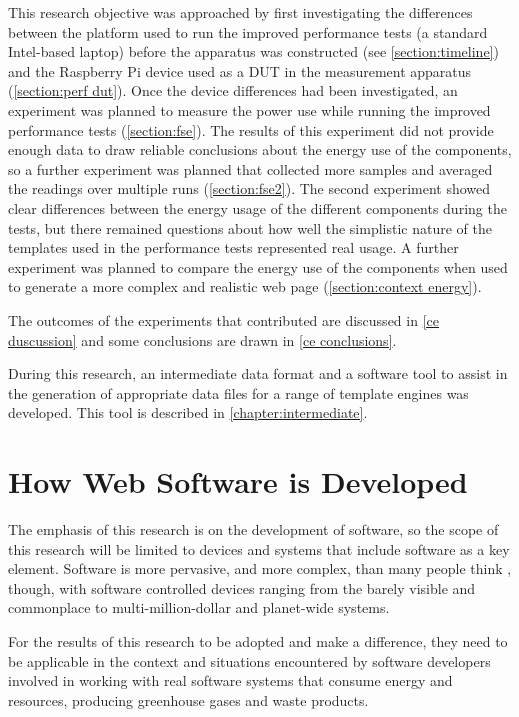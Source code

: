 \label{A207}
This research objective was approached by first investigating the differences between the platform used to run the improved performance tests (a standard Intel-based laptop) before the apparatus was constructed (see \autoref{section:timeline}) and the Raspberry Pi device used as a DUT in the measurement apparatus (\autoref{section:perf dut}). Once the device differences had been investigated, an experiment was planned to measure the power use while running the improved performance tests (\autoref{section:fse}). The results of this experiment did not provide enough data to draw reliable conclusions about the energy use of the components, so a further experiment was planned that collected more samples and averaged the readings over multiple runs (\autoref{section:fse2}). The second experiment showed clear differences between the energy usage of the different components during the tests, but there remained questions about how well the simplistic nature of the templates used in the performance tests represented real usage. A further experiment was planned to compare the energy use of the components when used to generate a more complex and realistic web page (\autoref{section:context energy}).

The outcomes of the experiments that contributed are discussed in \autoref{ce duscussion} and some conclusions are drawn in \autoref{ce conclusions}.

During this research, an intermediate data format and a software tool to assist in the generation of appropriate data files for a range of \gls{template engine}s was developed. This tool is described in \autoref{chapter:intermediate}.


\chapter{How Web Software is Developed}
\label{chapter:context}

The emphasis of this research is on the development of software, so the scope of this research will be limited to devices and systems that include software as a key element. Software is more pervasive, and more complex, than many people think \citep{Kang2015}, though, with software controlled devices ranging from the barely visible and commonplace to multi-million-dollar and planet-wide systems.

For the results of this research to be adopted and make a difference, they need to be applicable in the context and situations encountered by software developers involved in working with real software systems that consume energy and resources, producing greenhouse gases and waste products.

